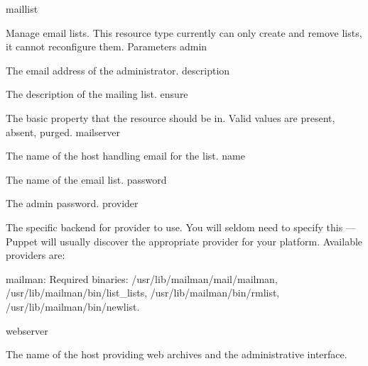 maillist

Manage email lists. This resource type currently can only create and remove lists, it cannot reconfigure them.
Parameters
admin

The email address of the administrator.
description

The description of the mailing list.
ensure

The basic property that the resource should be in. Valid values are present, absent, purged.
mailserver

The name of the host handling email for the list.
name

The name of the email list.
password

The admin password.
provider

The specific backend for provider to use. You will seldom need to specify this — Puppet will usually discover the appropriate provider for your platform. Available providers are:

    mailman: Required binaries: /usr/lib/mailman/mail/mailman, /usr/lib/mailman/bin/list_lists, /usr/lib/mailman/bin/rmlist, /usr/lib/mailman/bin/newlist.

webserver

The name of the host providing web archives and the administrative interface.
